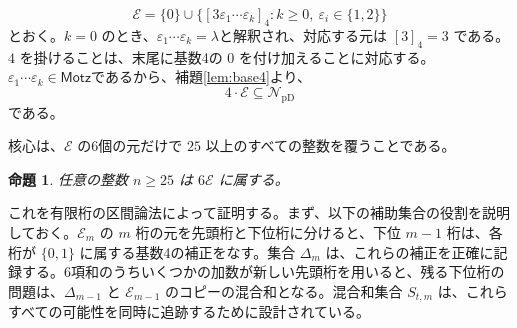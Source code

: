 \documentclass[12pt]{ltjsarticle}
\theoremstyle{plain}
\newtheorem{proposition}[theorem]{命題}
\theoremstyle{definition}
\theoremstyle{plain}
\newcommand{\val}[2]{[#1]_{#2}}
\newcommand{\NpD}{\mathcal{N}_{\mathrm{pD}}}
\begin{document}
\[
 \mathcal E=\{0\}\cup
 \bigl\{\val{3\varepsilon_1\cdots\varepsilon_k}{4}:
        k\geq0,\ \varepsilon_i\in\{1,2\}\bigr\}
\]
とおく。$k=0$ のとき、$\varepsilon_1\cdots\varepsilon_k=\lambda$と解釈され、対応する元は $\val{3}{4}=3$ である。$4$ を掛けることは、末尾に基数4の $0$ を付け加えることに対応する。$\varepsilon_1\cdots\varepsilon_k\in\mathsf{Motz}$であるから、補題\ref{lem:base4}より、
\begin{equation}\label{eq:4E}
        4\cdot\mathcal E\subseteq\NpD
\end{equation}
である。

核心は、$\mathcal E$ の6個の元だけで $25$ 以上のすべての整数を覆うことである。

\begin{proposition}\label{prop:E}
任意の整数 $n\geq25$ は $6\mathcal E$ に属する。
\end{proposition}

これを有限桁の区間論法によって証明する。まず、以下の補助集合の役割を説明しておく。$\mathcal E_m$ の $m$ 桁の元を先頭桁と下位桁に分けると、下位 $m-1$ 桁は、各桁が $\{0,1\}$ に属する基数4の補正をなす。集合 $\Delta_m$ は、これらの補正を正確に記録する。6項和のうちいくつかの加数が新しい先頭桁を用いると、残る下位桁の問題は、$\Delta_{m-1}$ と $\mathcal E_{m-1}$ のコピーの混合和となる。混合和集合 $S_{t,m}$ は、これらすべての可能性を同時に追跡するために設計されている。
\end{document}
